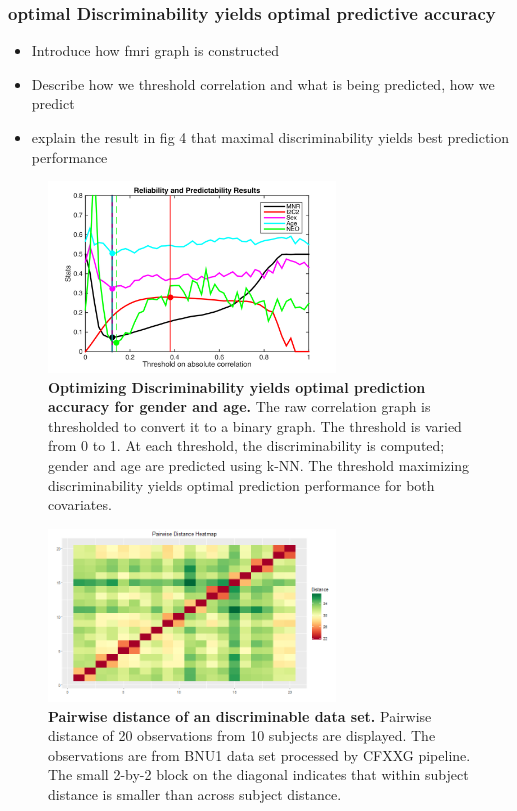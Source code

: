\documentclass{article}
\begin{document}
\subsubsection{optimal Discriminability yields optimal predictive accuracy}
\begin{itemize}
\item Introduce how fmri graph is constructed
\item Describe how we threshold correlation and what is being predicted, how we predict
\item explain the result in fig 4 that maximal discriminability yields best prediction performance 
\end{itemize}

\begin{figure}[t!]
\includegraphics[width=3.0in]{../Figs/HCP.png}
\caption{{\bf Optimizing Discriminability yields optimal prediction accuracy for gender and age.} The raw correlation graph is thresholded to convert it to a binary graph. The threshold is varied from 0 to 1. At each threshold, the discriminability is computed; gender and age are predicted using k-NN. The threshold maximizing discriminability yields optimal prediction performance for both covariates. }
\label{fig:4}
\end{figure}

\begin{figure}[t!]
\includegraphics[width=3.0in]{../Figs/pairdistance.png}
\caption{{\bf Pairwise distance of an discriminable data set.} Pairwise distance of 20 observations from 10 subjects are displayed. The observations are from BNU1 data set processed by CFXXG pipeline. The small 2-by-2 block on the diagonal indicates that within subject distance is smaller than across subject distance. }
\label{fig:5}
\end{figure}
\end{document}
